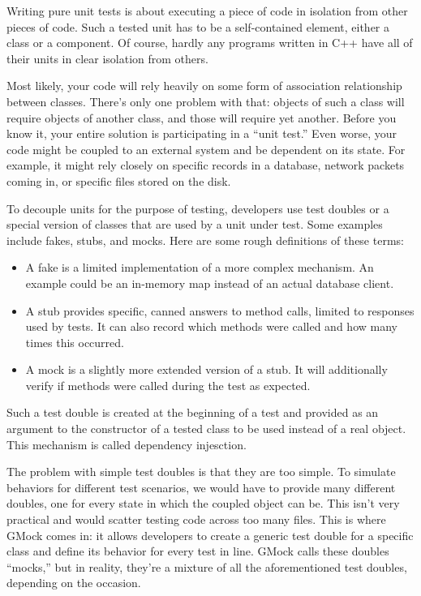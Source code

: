 
Writing pure unit tests is about executing a piece of code in isolation from other pieces of code. Such a tested unit has to be a self-contained element, either a class or a component. Of course, hardly any programs written in C++ have all of their units in clear isolation from others.

Most likely, your code will rely heavily on some form of association relationship between classes. There’s only one problem with that: objects of such a class will require objects of another class, and those will require yet another. Before you know it, your entire solution is participating in a “unit test.” Even worse, your code might be coupled to an external system and be dependent on its state. For example, it might rely closely on specific records in a database, network packets coming in, or specific files stored on the disk.

To decouple units for the purpose of testing, developers use test doubles or a special version of classes that are used by a unit under test. Some examples include fakes, stubs, and mocks. Here are some rough definitions of these terms:

\begin{itemize}
\item
A fake is a limited implementation of a more complex mechanism. An example could be an in-memory map instead of an actual database client.

\item
A stub provides specific, canned answers to method calls, limited to responses used by tests. It can also record which methods were called and how many times this occurred.

\item
A mock is a slightly more extended version of a stub. It will additionally verify if methods were called during the test as expected.
\end{itemize}

Such a test double is created at the beginning of a test and provided as an argument to the constructor of a tested class to be used instead of a real object. This mechanism is called dependency injesction.

The problem with simple test doubles is that they are too simple. To simulate behaviors for different test scenarios, we would have to provide many different doubles, one for every state in which the coupled object can be. This isn’t very practical and would scatter testing code across too many files. This is where GMock comes in: it allows developers to create a generic test double for a specific class and define its behavior for every test in line. GMock calls these doubles “mocks,” but in reality, they’re a mixture of all the aforementioned test doubles, depending on the occasion.

